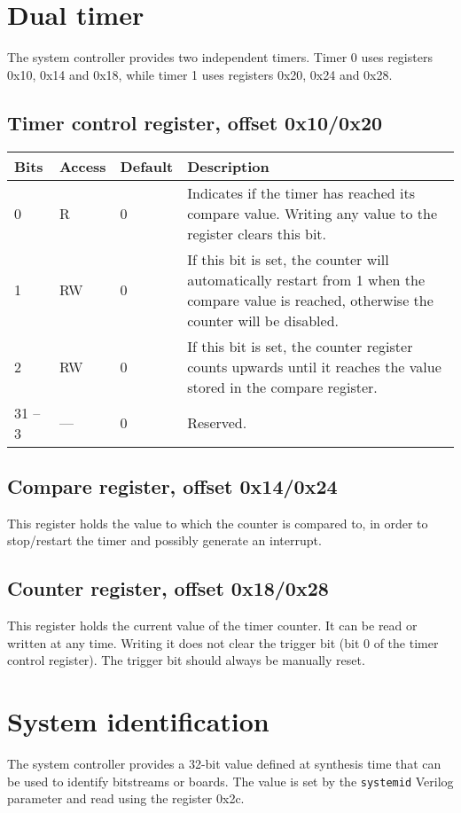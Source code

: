 \documentclass[a4paper,11pt]{article}
\begin{document}
\section{Dual timer}
The system controller provides two independent timers. Timer 0 uses registers 0x10, 0x14 and 0x18, while timer 1 uses registers 0x20, 0x24 and 0x28.

\subsection{Timer control register, offset 0x10/0x20}
\begin{tabular}{|p{1.5cm}|l|l|p{10cm}|}
\hline
\bf Bits & \bf Access & \bf Default & \bf Description \\
\hline
0 & R & 0 & Indicates if the timer has reached its compare value. Writing any value to the register clears this bit. \\
\hline
1 & RW & 0 & If this bit is set, the counter will automatically restart from 1 when the compare value is reached, otherwise the counter will be disabled. \\
\hline
2 & RW & 0 & If this bit is set, the counter register counts upwards until it reaches the value stored in the compare register. \\
\hline
31 -- 3 & --- & 0 & Reserved. \\
\hline
\end{tabular}

\subsection{Compare register, offset 0x14/0x24}
This register holds the value to which the counter is compared to, in order to stop/restart the timer and possibly generate an interrupt.

\subsection{Counter register, offset 0x18/0x28}
This register holds the current value of the timer counter. It can be read or written at any time.
Writing it does not clear the trigger bit (bit 0 of the timer control register). The trigger bit should always be manually reset.

\section{System identification}
The system controller provides a 32-bit value defined at synthesis time that can be used to identify bitstreams or boards. The value is set by the \verb!systemid! Verilog parameter and read using the register 0x2c.
\end{document}
